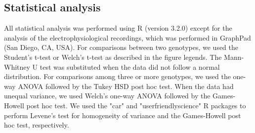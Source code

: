 \subsection*{Statistical analysis}

All statistical analysis was performed using R (version 3.2.0)\cite{R} except for the analysis of the electrophysiological recordings, which was performed in GraphPad (San Diego, CA, USA).
For comparisons between two genotypes, we used the Student's t-test or Welch's t-test as described in the figure legends.
The Mann-Whitney U test was substituted when the data did not follow a normal distribution.
For comparisons among three or more genotypes, we used the one-way ANOVA followed by the Tukey HSD post hoc test. 
When the data had unequal variance, we used Welch's one-way ANOVA followed by the Games-Howell post hoc test.
We used the "car"\cite{car} and "userfriendlyscience"\cite{user} R packages to perform Levene's test for homogeneity of variance and the Games-Howell post hoc test, respectively.